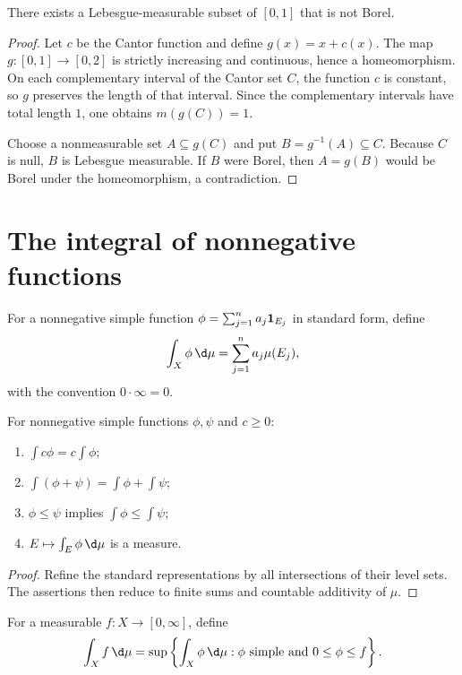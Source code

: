 \begin{prop}
There exists a Lebesgue-measurable subset of $[0,1]$ that is not Borel.
\end{prop}

\begin{proof}
Let $c$ be the Cantor function and define $g(x)=x+c(x)$. The map $g:[0,1]\to[0,2]$ is strictly increasing and continuous, hence a homeomorphism. On each complementary interval of the Cantor set $C$, the function $c$ is constant, so $g$ preserves the length of that interval. Since the complementary intervals have total length $1$, one obtains $m(g(C))=1$.

Choose a nonmeasurable set $A\subseteq g(C)$ and put $B=g^{-1}(A)\subseteq C$. Because $C$ is null, $B$ is Lebesgue measurable. If $B$ were Borel, then $A=g(B)$ would be Borel under the homeomorphism, a contradiction.
\end{proof}

\section{The integral of nonnegative functions}

\begin{de}
For a nonnegative simple function $\phi=\sum_{j=1}^na_j\mathbf{1}_{E_j}$ in standard form, define
\[
\int_X\phi\,\d\mu=\sum_{j=1}^na_j\mu(E_j),
\]
with the convention $0\cdot\infty=0$.
\end{de}

\begin{prop}
For nonnegative simple functions $\phi,\psi$ and $c\geq0$:
\begin{enumerate}
  \item $\int c\phi=c\int\phi$;
  \item $\int(\phi+\psi)=\int\phi+\int\psi$;
  \item $\phi\leq\psi$ implies $\int\phi\leq\int\psi$;
  \item $E\mapsto\int_E\phi\,\d\mu$ is a measure.
\end{enumerate}
\end{prop}

\begin{proof}
Refine the standard representations by all intersections of their level sets. The assertions then reduce to finite sums and countable additivity of $\mu$.
\end{proof}

\begin{de}
For a measurable $f:X\to[0,\infty]$, define
\[
\int_Xf\,\d\mu
 =\sup\left\{\int_X\phi\,\d\mu:
   \phi\text{ simple and }0\leq\phi\leq f\right\}.
\]
\end{de}

